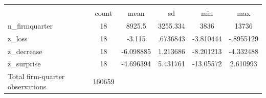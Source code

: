 {
\def\sym#1{\ifmmode^{#1}\else\(^{#1}\)\fi}
\begin{tabular}{l*{1}{ccccc}}
\hline\hline
                    &\multicolumn{5}{c}{}                                            \\
                    &       count&        mean&          sd&         min&         max\\
\hline
n\_firmquarter       &          18&      8925.5&    3255.334&        3836&       13736\\
z\_loss              &          18&      -3.115&    .6736843&   -3.810444&   -.8955129\\
z\_decrease          &          18&   -6.098885&    1.213686&   -8.201213&   -4.332488\\
z\_surprise          &          18&   -4.696394&    5.431761&   -13.05572&    2.610993\\
\hline
Total firm-quarter observations&      160659&            &            &            &            \\
\hline\hline
\end{tabular}
}
